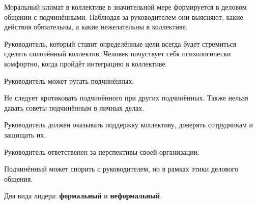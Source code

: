 \documentclass{article}
\begin{document}
\begin{multienumerate}
\end{multienumerate}

Моральный климат в коллективе в значительной мере формируется в деловом общении с подчинёнными. Наблюдая за руководителем они выясняют, какие действия обязательны, а какие нежелательны в коллективе.

Руководитель, который ставит определённые цели всегда будет стремиться сделать сплочённый коллектив. Человек почуствует себя психологически комфортно, когда пройдёт интеграцию в коллективе.

Руководитель может ругать подчинённых.

Не следует критиковать подчинённого при других подчинённых. Также нельзя давать советы подчинённым в личных делах.

Руководитель должен оказывать поддержку коллективу, доверять сотрудникам и защищать их.

Руководитель ответственен за перспективы своей организации.

Подчинённый может спорить с руководителем, но в рамках этики делового общения.

Два вида лидера: \textbf{формальный} и \textbf{неформальный}.
\end{document}
